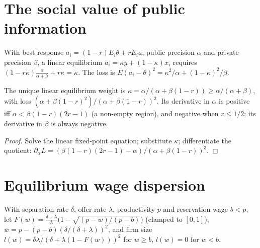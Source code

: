 \section{The social value of public information}

\begin{definition}
\label{def:morris_shin}
\leanok
With best response $a_i=(1-r)E_i\theta+rE_i\bar a$, public precision $\alpha$ and private precision $\beta$, a linear equilibrium
$a_i=\kappa y+(1-\kappa)x_i$ requires $(1-r\kappa)\frac{\alpha}{\alpha+\beta}+r\kappa=\kappa$. The loss is
$E(a_i-\theta)^2=\kappa^2/\alpha+(1-\kappa)^2/\beta$.
\end{definition}

\begin{theorem}
\label{thm:morris_shin}
\leanok
{}
The unique linear equilibrium weight is $\kappa=\alpha/(\alpha+\beta(1-r))\ge\alpha/(\alpha+\beta)$, with loss
$(\alpha+\beta(1-r)^2)/(\alpha+\beta(1-r))^2$. Its derivative in $\alpha$ is positive iff $\alpha<\beta(1-r)(2r-1)$ (a non-empty
region), and negative when $r\le1/2$; its derivative in $\beta$ is always negative.
\end{theorem}
\begin{proof}
\leanok
Solve the linear fixed-point equation; substitute $\kappa$; differentiate the quotient:
$\partial_\alpha L=(\beta(1-r)(2r-1)-\alpha)/(\alpha+\beta(1-r))^3$.
\end{proof}

\section{Equilibrium wage dispersion}

\begin{definition}
\label{def:burdett_mortensen}
\leanok
With separation rate $\delta$, offer rate $\lambda$, productivity $p$ and reservation wage $b<p$, let
$F(w)=\frac{\delta+\lambda}{\lambda}\bigl(1-\sqrt{(p-w)/(p-b)}\bigr)$ (clamped to $[0,1]$), $\bar w=p-(p-b)(\delta/(\delta+\lambda))^2$, and
firm size $l(w)=\delta\lambda/(\delta+\lambda(1-F(w)))^2$ for $w\ge b$, $l(w)=0$ for $w<b$.
\end{definition}


